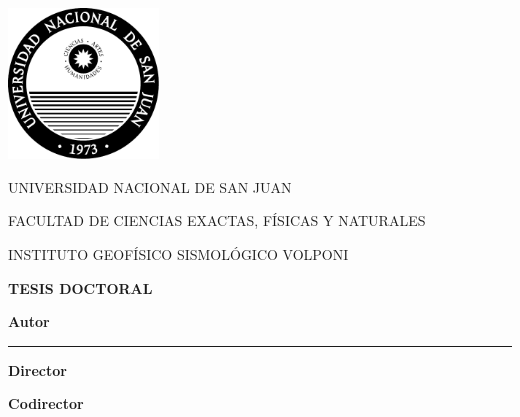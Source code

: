 \begin{titlepage}

    \begin{center}

        \includegraphics[height=4cm]{figs/logos/unsj.pdf}
        \vspace{1.5em}

        {\normalsize
        UNIVERSIDAD NACIONAL DE SAN JUAN
        }

        {\normalsize
        FACULTAD DE CIENCIAS EXACTAS, FÍSICAS Y NATURALES
        }

        {\normalsize
        INSTITUTO GEOFÍSICO SISMOLÓGICO VOLPONI
        }
        \vspace{3em}

        \textbf{\large TESIS DOCTORAL}
        \vspace{3em}

        \textbf{\LARGE \Title}

        \vspace{\fill}

        \textbf{\large Autor}
        \vspace{1em}

        {\large \LicSoler{}}
        \vspace{1em}

        \rule{\linewidth}{1px}
        \vspace{1em}

        \begin{minipage}{0.45\linewidth}
            \raggedright
            \textbf{\large Director}
            \vspace{1em}

            {\large \Mario{}}
        \end{minipage}
        \begin{minipage}{0.45\linewidth}
            \raggedleft
            \textbf{\large Codirector}
            \vspace{1em}

            {\large \Leo{}}
        \end{minipage}

        \vspace{4em}

        {\normalsize{}}

    \end{center}

\end{titlepage}
